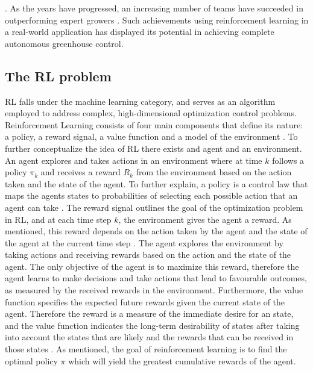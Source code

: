 \cite{vandenbemdRobustDeepReinforcement,wangDeepReinforcementLearning2020}. As the years have progressed, an increasing number of teams have succeeded in outperforming expert growers \cite{vandenbemdRobustDeepReinforcement,hemmingCherryTomatoProduction2020}. Such achievements using reinforcement learning in a real-world application has displayed its potential in achieving complete autonomous greenhouse control.

\subsection{The RL problem}
RL falls under the machine learning category, and serves as an algorithm employed to address complex, high-dimensional optimization control problems. 
Reinforcement Learning consists of four main components that define its nature: a policy, a reward signal, a value function and a model of the environment \cite{suttonReinforcementLearningIntroduction2014}. To further conceptualize the idea of RL there exists and agent and an environment. An agent explores and takes actions in an environment where at time $k$ follows a policy $\pi_{k}$ and receives a reward $R_{k}$ from the environment based on the action taken and the state of the agent. To further explain, a policy is a control law that maps the agents states to probabilities of selecting each possible action that an agent can take \cite{suttonReinforcementLearningIntroduction2014}. The reward signal outlines the goal of the optimization problem in RL, and at each time step $k$, the environment gives the agent a reward. As mentioned, this reward depends on the action taken by the agent and the state of the agent at the current time step \cite{suttonReinforcementLearningIntroduction2014}.
The agent explores the environment by taking actions and receiving rewards based on the action and the state of the agent. The only objective of the agent is to maximize this reward, therefore the agent learns to make decisions and take actions that lead to favourable outcomes, as measured by the received rewards in the environment. Furthermore, the value function specifies the expected future rewards given the current state of the agent. Therefore the reward is a measure of the immediate desire for an state, and the value function indicates the long-term desirability of states after taking into account the states that are likely and the rewards that can be received in those states \cite{suttonReinforcementLearningIntroduction2014}. As mentioned, the goal of reinforcement learning is to find the optimal policy $\pi$ which will yield the greatest cumulative rewards of the agent.



